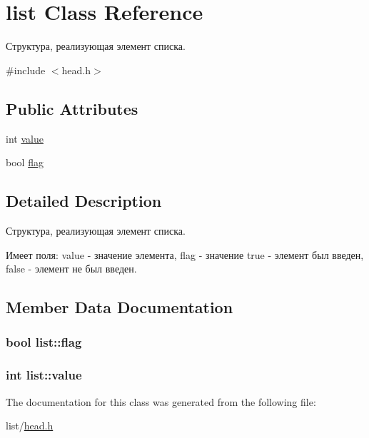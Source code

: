 \hypertarget{structlist}{\section{list Class Reference}
\label{structlist}
}


Структура, реализующая элемент списка.  




{\ttfamily \#include $<$head.\-h$>$}

\subsection*{Public Attributes}
\begin{DoxyCompactItemize}
\item 
int \hyperlink{structlist_a4fad30956372d1c56dd60d113d32ed8a}{value}
\item 
bool \hyperlink{structlist_a6e854083048f0306ed79e86c003e8fe0}{flag}
\end{DoxyCompactItemize}


\subsection{Detailed Description}
Структура, реализующая элемент списка. 

Имеет поля\-: value -\/ значение элемента, flag -\/ значение true -\/ элемент был введен, false -\/ элемент не был введен. 

\subsection{Member Data Documentation}
\hypertarget{structlist_a6e854083048f0306ed79e86c003e8fe0}{
\subsubsection[{flag}]{\setlength{\rightskip}{0pt plus 5cm}bool list\-::flag}}\label{structlist_a6e854083048f0306ed79e86c003e8fe0}
\hypertarget{structlist_a4fad30956372d1c56dd60d113d32ed8a}{
\subsubsection[{value}]{\setlength{\rightskip}{0pt plus 5cm}int list\-::value}}\label{structlist_a4fad30956372d1c56dd60d113d32ed8a}


The documentation for this class was generated from the following file\-:\begin{DoxyCompactItemize}
\item 
list/\hyperlink{head_8h}{head.\-h}\end{DoxyCompactItemize}

